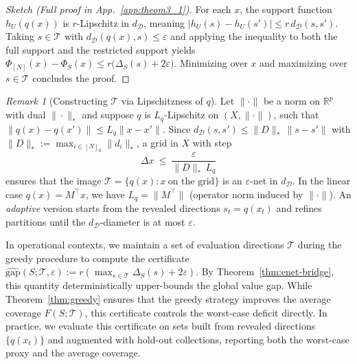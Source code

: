 \documentclass[accepted]{uai2026}
\theoremstyle{plain}
\theoremstyle{definition}
\theoremstyle{remark}
\newtheorem{remark}[theorem]{Remark}
\newcommand{\R}{\mathbb{R}}
\begin{document}
\begin{proof}[\textit{Sketch (Full proof in App.~\ref{app:theom3_1})}]
For each $x$, the support function $h_{U}(q(x))$ is $r$-Lipschitz in $d_{\mathcal D}$, meaning $|h_{U}(s)-h_{U}(s')|\le r\, d_{\mathcal D}(s,s')$. Taking $s\in\mathcal T$ with $d_{\mathcal D}(q(x),s)\le\varepsilon$ and applying the inequality to both the full support and the restricted support yields $\Phi_{[N]}(x)-\Phi_S(x)\le r\big(\Delta_S(s)+2\varepsilon\big)$. Minimizing over $x$ and maximizing over $s\in\mathcal T$ concludes the proof.
\end{proof}

\begin{remark}[Constructing $\mathcal T$ via Lipschitzness of $q$]\label{rmk:enet-const}
Let $\|\cdot\|$ be a norm on $\R^p$ with dual $\|\cdot\|_\ast$ and suppose $q$ is $L_q$-Lipschitz
on $(X,\|\cdot\|)$, such that $\|q(x)-q(x')\|\le L_q\|x-x'\|$.
Since $d_{\mathcal D}(s,s')\le \|D\|_\ast\,\|s-s'\|$ with $\|D\|_\ast:=\max_{i\in[N]_0}\|d_i\|_\ast$,
a grid in $X$ with step
\[
\Delta x\ \le\ \frac{\varepsilon}{\|D\|_\ast\,L_q}
\]
ensures that the image $\mathcal T=\{q(x): x\ \text{on the grid}\}$ is an $\varepsilon$-net in $d_{\mathcal D}$.
In the linear case $q(x)=M^\top x$, we have $L_q=\|M^\top\|$ (operator norm induced by $\|\cdot\|$).
An \emph{adaptive} version starts from the revealed directions $s_t=q(x_t)$ and refines partitions
until the $d_{\mathcal D}$-diameter is at most $\varepsilon$.
\end{remark}

In operational contexts, we maintain a set of evaluation directions $\mathcal T$ during the greedy procedure to compute the certificate $\widehat{\mathrm{gap}}(S;\mathcal T,\varepsilon) := r(\max_{s\in\mathcal T}\Delta_S(s) + 2\varepsilon)$. By Theorem~\ref{thm:enet-bridge}, this quantity deterministically upper-bounds the global value gap. While Theorem~\ref{thm:greedy} ensures that the greedy strategy improves the average coverage $F(S;\mathcal T)$, this certificate controls the worst-case deficit directly. In practice, we evaluate this certificate on sets built from revealed directions $\{q(x_t)\}$ and augmented with hold-out collections, reporting both the worst-case proxy and the average coverage.

\end{document}
